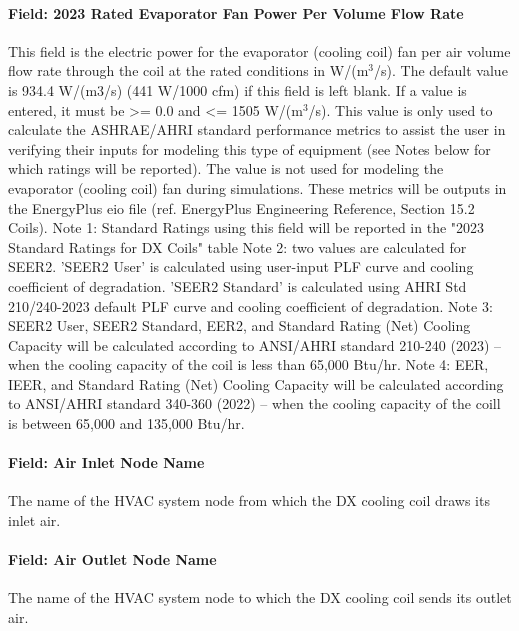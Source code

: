 \paragraph{Field: 2023 Rated Evaporator Fan Power Per Volume Flow Rate}

This field is the electric power for the evaporator (cooling coil) fan per air volume flow rate through the coil at the rated conditions in W/(m\(^{3}\)/s). The default value is 934.4 W/(m3/s) (441 W/1000 cfm) if this field is left blank. If a value is entered, it must be \textgreater{}= 0.0 and \textless{}= 1505 W/(m\(^{3}\)/s). This value is only used to calculate the ASHRAE/AHRI standard performance metrics to assist the user in verifying their inputs for modeling this type of equipment (see Notes below for which ratings will be reported).  The value is not used for modeling the evaporator (cooling coil) fan during simulations.  These metrics will be outputs in the EnergyPlus eio file (ref. EnergyPlus Engineering Reference, Section 15.2 Coils). 
Note 1: Standard Ratings using this field will be reported in the "2023 Standard Ratings for DX Coils" table
Note 2: two values are calculated for SEER2. 'SEER2 User' is calculated using user-input PLF curve and cooling coefficient of degradation. 'SEER2 Standard' is calculated using AHRI Std 210/240-2023 default PLF curve and cooling coefficient of degradation.
Note 3: SEER2 User, SEER2 Standard, EER2, and Standard Rating (Net) Cooling Capacity will be calculated according to ANSI/AHRI standard 210-240 (2023) -- when the cooling capacity of the coil is less than 65,000 Btu/hr.
Note 4: EER, IEER, and Standard Rating (Net) Cooling Capacity will be calculated according to ANSI/AHRI standard 340-360 (2022) -- when the cooling capacity of the coill is between 65,000 and 135,000 Btu/hr.

\paragraph{Field: Air Inlet Node Name}\label{field-air-inlet-node-name-9}

The name of the HVAC system node from which the DX cooling coil draws its inlet air.

\paragraph{Field: Air Outlet Node Name}\label{field-air-outlet-node-name-9-000}

The name of the HVAC system node to which the DX cooling coil sends its outlet air.

